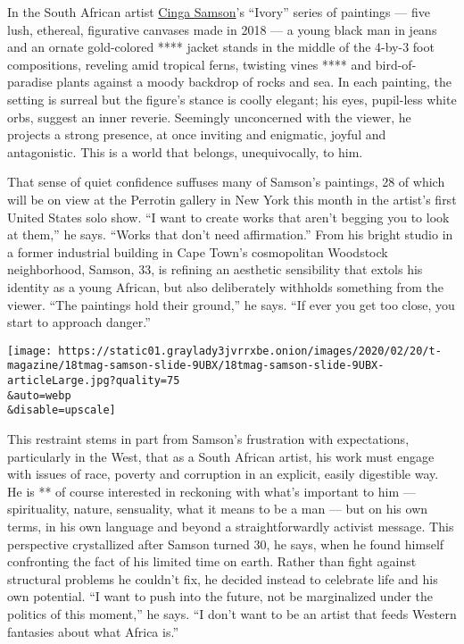 In the South African artist
\href{https://www.perrotin.com/artists/cinga_samson/488}{Cinga Samson}'s
``Ivory'' series of paintings --- five lush, ethereal, figurative
canvases made in 2018 --- a young black man in jeans and an ornate
gold-colored **** jacket stands in the middle of the 4-by-3 foot
compositions, reveling amid tropical ferns, twisting vines **** and
bird-of-paradise plants against a moody backdrop of rocks and sea. In
each painting, the setting is surreal but the figure's stance is coolly
elegant; his eyes, pupil-less white orbs, suggest an inner reverie.
Seemingly unconcerned with the viewer, he projects a strong presence, at
once inviting and enigmatic, joyful and antagonistic. This is a world
that belongs, unequivocally, to him.

That sense of quiet confidence suffuses many of Samson's paintings, 28
of which will be on view at the Perrotin gallery in New York this month
in the artist's first United States solo show. ``I want to create works
that aren't begging you to look at them,'' he says. ``Works that don't
need affirmation.'' From his bright studio in a former industrial
building in Cape Town's cosmopolitan Woodstock neighborhood, Samson, 33,
is refining an aesthetic sensibility that extols his identity as a young
African, but also deliberately withholds something from the viewer.
``The paintings hold their ground,'' he says. ``If ever you get too
close, you start to approach danger.''

\texttt{[image: https://static01.graylady3jvrrxbe.onion/images/2020/02/20/t-magazine/18tmag-samson-slide-9UBX/18tmag-samson-slide-9UBX-articleLarge.jpg?quality=75\\\&auto=webp\\\&disable=upscale]}

This restraint stems in part from Samson's frustration with
expectations, particularly in the West, that as a South African artist,
his work must engage with issues of race, poverty and corruption in an
explicit, easily digestible way. He is ** of course interested in
reckoning with what's important to him --- spirituality, nature,
sensuality, what it means to be a man --- but on his own terms, in his
own language and beyond a straightforwardly activist message. This
perspective crystallized after Samson turned 30, he says, when he found
himself confronting the fact of his limited time on earth. Rather than
fight against structural problems he couldn't fix, he decided instead to
celebrate life and his own potential. ``I want to push into the future,
not be marginalized under the politics of this moment,'' he says. ``I
don't want to be an artist that feeds Western fantasies about what
Africa is.''

